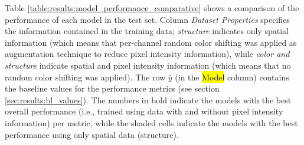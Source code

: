 
\glsresetall
\graphicspath{{./Sections/Results/Resources/}}

Table \ref{table:results:model_performance_comparative} shows a comparison of the performance of each model in the test set. Column \textit{Dataset Properties} specifies the information contained in the training data; \textit{structure} indicates only spatial information (which means that per-channel random color shifting was applied as augmentation technique to reduce pixel intensity information), while \textit{color and structure} indicate spatial and pixel intensity information (which means that no random color shifting was applied). The row $\bar{y}$ (in the \hl{Model} column) contains the baseline values for the performance metrics (see section \ref{sec:results:bl_values}). The numbers in bold indicate the models with the best overall performance (i.e., trained using data with and without pixel intensity information) per metric, while the shaded cells indicate the models with the best performance using only spatial data (structure).

\setlength{\mylinewidth}{\linewidth-7pt}%
\setlength{\mylengtha}{0.17\mylinewidth-2\arraycolsep}%
\setlength{\mylengthb}{0.2\mylinewidth-2\arraycolsep}%
\setlength{\mylengthc}{0.1\mylinewidth-2\arraycolsep}%
\setlength{\mylengthd}{0.1\mylinewidth-2\arraycolsep}%
\setlength{\mylengthe}{0.1\mylinewidth-2\arraycolsep}%
\setlength{\mylengthf}{0.09\mylinewidth-2\arraycolsep}%
\setlength{\mylengthg}{0.1\mylinewidth-2\arraycolsep}%
\setlength{\mylengthh}{0.1\mylinewidth-2\arraycolsep}%


